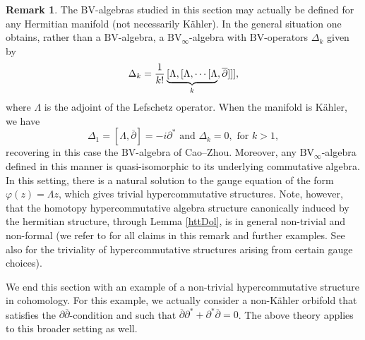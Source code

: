 \documentclass[a4paper]{amsart}
\theoremstyle{definition}
\newtheorem{rema}[theo]{Remark}
\theoremstyle{theorem}
\newcommand{\del}{\partial}
\newcommand{\delb}{{\overline\partial}}
\newcommand{\BV}{{\mathrm{BV}}}
\begin{document}
\begin{rema}\label{morebvs}
 The $\BV$-algebras studied in this section may actually be defined for any Hermitian manifold (not necessarily Kähler).
In the general situation
 one obtains, rather than a $\BV$-algebra, a $\BV_\infty$-algebra with $\BV$-operators $\Delta_k$ given by
\[\Delta_k={1\over k!}\underbrace{[\Lambda,[\Lambda,\cdots[\Lambda}_{k},\delb]]],\]
where $\Lambda$ is the adjoint of the Lefschetz operator.
When the manifold is Kähler, we have
\[\Delta_1=[\Lambda,\delb]=-i\del^*\text{ and }\Delta_k=0,\text{ for }k>1,\]
recovering in this case the $\BV$-algebra of Cao--Zhou.
Moreover, any $\BV_\infty$-algebra defined in this manner is quasi-isomorphic to its underlying commutative algebra.
In this setting, there is a natural solution to the gauge equation of the form $\varphi(z)=\Lambda z$,
which gives trivial hypercommutative structures. Note, however, that the
homotopy hypercommutative algebra structure canonically induced by the hermitian structure, through Lemma \ref{httDol},
is in general non-trivial and non-formal (we refer to \cite{CiWi} for all claims in this remark and further examples. See also \cite{Muro2} for the triviality of hypercommutative structures arising from certain gauge choices).
\end{rema}


We end this section with an example of a non-trivial hypercommutative structure in cohomology.  For this example, we actually consider a non-Kähler orbifold that satisfies the $\del\delb$-condition and such that $\delb\del^*+\del^*\delb=0$. The above theory applies to this broader setting as well.
\end{document}
